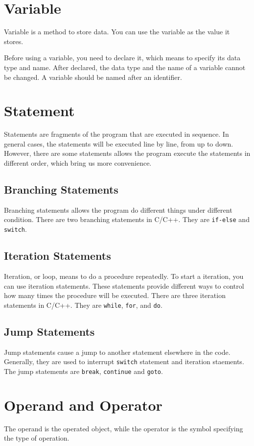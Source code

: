 \documentclass{report}
\begin{document}
    
\section{Variable}
    Variable is a method to store data. You can use the variable as the value it stores.

    Before using a variable, you need to declare it, which means to specify its data type and name. After declared, the data type and the name of a variable cannot be changed. A variable should be named after an identifier.

\section{Statement}
    Statements are fragments of the program that are executed in sequence. In general cases, the statements will be executed line by line, from up to down. However, there are some statements allows the program execute the statements in different order, which bring us more convenience.

    \subsection{Branching Statements}
    Branching statements allows the program do different things under different condition. There are two branching statements in C/C++. They are \texttt{if-else} and \texttt{switch}.
    \subsection{Iteration Statements}
    Iteration, or loop, means to do a procedure repeatedly. To start a iteration, you can use iteration statements. These statements provide different ways to control how many times the procedure will be executed. There are three iteration statements in C/C++. They are \texttt{while}, \texttt{for}, and \texttt{do}.
    \subsection{Jump Statements}
    Jump statements cause a jump to another statement elsewhere in the code. Generally, they are used to interrupt \texttt{switch} statement and iteration staements. The jump statements are \texttt{break}, \texttt{continue} and \texttt{goto}. 

\section{Operand and Operator}
    The operand is the operated object, while the operator is the symbol specifying the type of operation.
\end{document}
